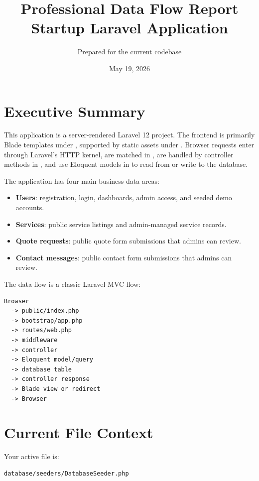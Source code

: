 \documentclass[11pt,a4paper]{article}
\title{\textbf{Professional Data Flow Report}\\Startup Laravel Application}
\author{Prepared for the current codebase}
\date{May 19, 2026}
\begin{document}
\maketitle
\tableofcontents
\newpage

\section{Executive Summary}

This application is a server-rendered Laravel 12 project. The frontend is primarily Blade templates under , supported by static assets under . Browser requests enter through Laravel's HTTP kernel, are matched in , are handled by controller methods in , and use Eloquent models in  to read from or write to the database.

The application has four main business data areas:

\begin{itemize}
    \item \textbf{Users}: registration, login, dashboards, admin access, and seeded demo accounts.
    \item \textbf{Services}: public service listings and admin-managed service records.
    \item \textbf{Quote requests}: public quote form submissions that admins can review.
    \item \textbf{Contact messages}: public contact form submissions that admins can review.
\end{itemize}

The data flow is a classic Laravel MVC flow:

\begin{verbatim}
Browser
  -> public/index.php
  -> bootstrap/app.php
  -> routes/web.php
  -> middleware
  -> controller
  -> Eloquent model/query
  -> database table
  -> controller response
  -> Blade view or redirect
  -> Browser
\end{verbatim}

\section{Current File Context}

Your active file is:

\begin{verbatim}
database/seeders/DatabaseSeeder.php
\end{verbatim}
\end{document}
